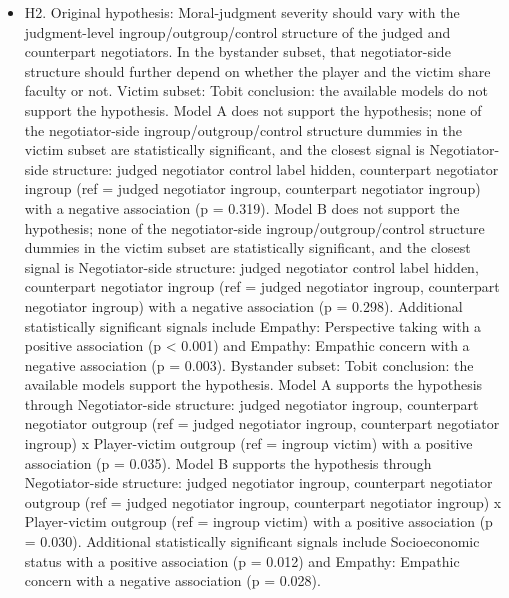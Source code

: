 \documentclass[11pt]{article}
\begin{document}
\begin{itemize}
\item H2. Original hypothesis: Moral-judgment severity should vary with the judgment-level ingroup/outgroup/control structure of the judged and counterpart negotiators. In the bystander subset, that negotiator-side structure should further depend on whether the player and the victim share faculty or not. Victim subset: Tobit conclusion: the available models do not support the hypothesis. Model A does not support the hypothesis; none of the negotiator-side ingroup/outgroup/control structure dummies in the victim subset are statistically significant, and the closest signal is Negotiator-side structure: judged negotiator control label hidden, counterpart negotiator ingroup (ref = judged negotiator ingroup, counterpart negotiator ingroup) with a negative association (p = 0.319). Model B does not support the hypothesis; none of the negotiator-side ingroup/outgroup/control structure dummies in the victim subset are statistically significant, and the closest signal is Negotiator-side structure: judged negotiator control label hidden, counterpart negotiator ingroup (ref = judged negotiator ingroup, counterpart negotiator ingroup) with a negative association (p = 0.298). Additional statistically significant signals include Empathy: Perspective taking with a positive association (p < 0.001) and Empathy: Empathic concern with a negative association (p = 0.003). Bystander subset: Tobit conclusion: the available models support the hypothesis. Model A supports the hypothesis through Negotiator-side structure: judged negotiator ingroup, counterpart negotiator outgroup (ref = judged negotiator ingroup, counterpart negotiator ingroup) x Player-victim outgroup (ref = ingroup victim) with a positive association (p = 0.035). Model B supports the hypothesis through Negotiator-side structure: judged negotiator ingroup, counterpart negotiator outgroup (ref = judged negotiator ingroup, counterpart negotiator ingroup) x Player-victim outgroup (ref = ingroup victim) with a positive association (p = 0.030). Additional statistically significant signals include Socioeconomic status with a positive association (p = 0.012) and Empathy: Empathic concern with a negative association (p = 0.028).

\end{itemize}
\end{document}
